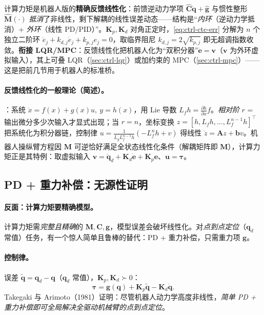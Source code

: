 \begin{insight}
计算力矩是机器人版的\textbf{精确反馈线性化}：前馈逆动力学项 $\hat{\mathbf{C}}\dot{\mathbf{q}}+\hat{\mathbf{g}}$ 与惯性整形 $\hat{\mathbf{M}}(\cdot)$ \emph{抵消}了非线性，剩下解耦的线性误差动态——结构是“\emph{内环}（逆动力学抵消）+ \emph{外环}（线性 PD/PID）”。$\mathbf{K}_p,\mathbf{K}_d$ 对角正定时，\cref{eq:ctrl-ctc-err} 分解为 $n$ 个独立二阶环 $\ddot e_j+k_{d,j}\dot e_j+k_{p,j}e_j=0$，取临界阻尼 $k_{d,j}=2\sqrt{k_{p,j}}$ 即无超调指数收敛。\textbf{衔接 LQR/MPC}：反馈线性化把机器人化为“双积分器”$\ddot{\mathbf{e}}=\mathbf{v}$（$\mathbf{v}$ 为外环虚拟输入），其上可叠 LQR（\cref{sec:ctrl-lqr}）或加约束的 MPC（\cref{sec:ctrl-mpc}）——这是把前几节用于机器人的标准桥。
\end{insight}

\paragraph{反馈线性化的一般理论（简述）。}
：系统 $\dot x=f(x)+g(x)u,\ y=h(x)$，用 Lie 导数 $L_fh=\frac{\partial h}{\partial x}f$。\emph{相对阶} $r$ = 输出微分多少次输入才显式出现；当 $r=n$，坐标变换 $z=[h,L_fh,\dots,L_f^{n-1}h]^\top$ 把系统化为积分器链，控制律 $u=\frac{1}{L_gL_f^{n-1}h}(-L_f^nh+v)$ 得线性 $\dot z=\mathbf{A}z+\mathbf{b}v$。机器人操纵臂方程因 $\mathbf{M}$ 可逆恰好满足全状态线性化条件（解耦矩阵即 $\mathbf{M}$），计算力矩正是其特例：取虚拟输入 $\mathbf{v}=\ddot{\mathbf{q}}_d+\mathbf{K}_d\dot{\mathbf{e}}+\mathbf{K}_p\mathbf{e}$、$\mathbf{u}=\boldsymbol{\tau}$。

\subsection{PD + 重力补偿：无源性证明}
\label{sec:ctrl-robot-pd}

\paragraph{反面：计算力矩要精确模型。}
计算力矩需\emph{完整且精确}的 $\mathbf{M},\mathbf{C},\mathbf{g}$，模型误差会破坏线性化。对\emph{点到点定位}（$\mathbf{q}_d$ 常值）任务，有一个惊人简单且鲁棒的替代：PD + 重力补偿，只需重力项 $\mathbf{g}$。

\paragraph{控制律。}
误差 $\tilde{\mathbf{q}}=\mathbf{q}_d-\mathbf{q}$（$\mathbf{q}_d$ 常值），$\mathbf{K}_p,\mathbf{K}_d\succ0$\cite{takegaki1981feedback}：
\begin{equation}
  \boldsymbol{\tau}=\mathbf{g}(\mathbf{q})+\mathbf{K}_p\tilde{\mathbf{q}}-\mathbf{K}_d\dot{\mathbf{q}}.
  \label{eq:ctrl-pd-grav}
\end{equation}
Takegaki 与 Arimoto（1981）证明：尽管机器人动力学高度非线性，\emph{简单 PD + 重力补偿即可全局解决全驱动机械臂的点到点定位}\cite{takegaki1981feedback}。

